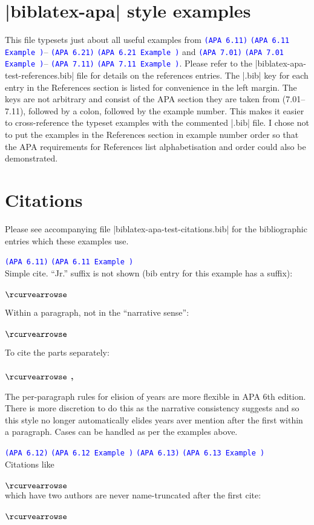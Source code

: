\documentclass[paper=a4]{article}
\newcommand\apa[2][]{\ifthenelse{\equal{#1}{}}%
                       {\textcolor{blue}{\texttt{(APA #2)}}}%
                       {\textcolor{blue}{\texttt{(APA #2 Example #1)}}}}
\def\apaex#1{\hbox{\hspace{-4em}\texttt{\small\detokenize{#1}}}\\$\rcurvearrowse$ \textbf{#1}}
\begin{document}
\section*{|biblatex-apa| style examples}
This file typesets just about all useful examples from
\apa{6.11}--\apa{6.21} and \apa{7.01}--\apa{7.11}. Please refer to the
|biblatex-apa-test-references.bib| file for details on the references
entries. The |.bib| key for each entry in the References section is listed
for convenience in the left margin. The keys are not arbitrary and consist
of the APA section they are taken from (7.01--7.11), followed by a colon,
followed by the example number. This makes it easier to cross-reference
the typeset examples with the commented |.bib| file. I chose not to put the
examples in the References section in example number order so that the APA
requirements for References list alphabetisation and order could also be
demonstrated.

\section*{Citations}

\noindent Please see accompanying file |biblatex-apa-test-citations.bib|
for the bibliographic entries which these examples use.

\noindent\apa{6.11}\\
Simple cite. ``Jr.'' suffix is not shown (bib entry for this example has a suffix):\\
\apaex{\textcite{6.11}}

\noindent Within a paragraph, not in the ``narrative sense'':\\
\apaex{\parencite{6.11}}

\noindent To cite the parts separately:\\
\apaex{\citeyear{6.11}, \citeauthor{6.11}}

\noindent The per-paragraph rules for elision of years are more flexible in
APA 6th edition. There is more discretion to do this as the narrative
consistency suggests and so this style no longer automatically elides years
aver mention after the first within a paragraph. Cases can be handled as
per the examples above.

\noindent\apa{6.12} \apa{6.13}\\
Citations like\\
\apaex{\textcite{6.12a}}\\
which have two authors are never name-truncated after the first cite:\\
\apaex{\textcite{6.12a}}
\end{document}

